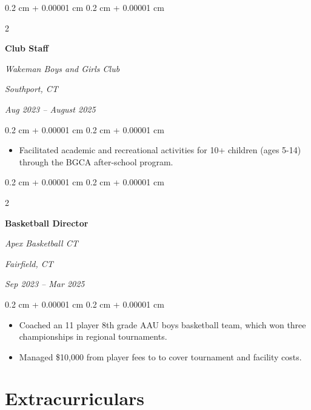 \documentclass[10pt, letterpaper]{article}
\newenvironment{highlights}{
    \begin{itemize}[
        topsep=0.10 cm,
        parsep=0.10 cm,
        partopsep=0pt,
        itemsep=0pt,
        leftmargin=0.4 cm + 10pt
    ]
}{
    \end{itemize}
} %
\newenvironment{onecolentry}{
    \begin{adjustwidth}{
        0.2 cm + 0.00001 cm
    }{
        0.2 cm + 0.00001 cm
    }
}{
    \end{adjustwidth}
} %
\newenvironment{twocolentry}[2][]{
    \onecolentry
    \def\secondColumn{#2}
    \setcolumnwidth{\fill, 4.5 cm}
    \begin{paracol}{2}
}{
    \switchcolumn \raggedleft \secondColumn
    \end{paracol}
    \endonecolentry
} %
\begin{document}
        \vspace{0.2 cm}

         
        \begin{twocolentry}{
            \textit{Southport, CT}    
                
            \textit{Aug 2023 – August 2025}}
                \textbf{Club Staff}
                
                \textit{Wakeman Boys and Girls Club}
            \end{twocolentry}
    
            \vspace{0.10 cm}
            \begin{onecolentry}
                \begin{highlights}
                    \item Facilitated academic and recreational activities for 10+ children (ages 5-14) through the BGCA after-school program.
                \end{highlights}
            \end{onecolentry}

        \vspace{0.2 cm}


        \begin{twocolentry}{
        \textit{Fairfield, CT}    
            
        \textit{Sep 2023 – Mar 2025}}
            \textbf{Basketball Director}
            
            \textit{Apex Basketball CT}
        \end{twocolentry}

        \vspace{0.10 cm}
        \begin{onecolentry}
            \begin{highlights}
                \item Coached an 11 player 8th grade AAU boys basketball team, which won three championships in regional tournaments.

                \item Managed \$10,000 from player fees to to cover tournament and facility costs. 
            \end{highlights}
        \end{onecolentry}

       
       
 

    \section{Extracurriculars}
    
\end{document}
